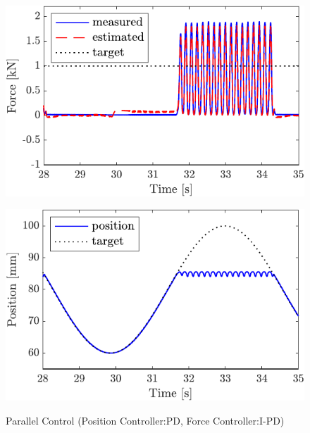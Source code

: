 \begin{figure}[t]
    \begin{minipage}{\minipageratio\hsize}
    \centering
        \includegraphics[keepaspectratio, scale = \minifigscale]{contents/IntegrationControl/figure/SECASQ/crop-FBsw_IPD_force.pdf}
        \label{fig5:crop-FBsw_IPD_force}
    \end{minipage}
    \begin{minipage}{\minipageratio\hsize}
    \centering
        \includegraphics[keepaspectratio, scale = \minifigscale]
        {contents/IntegrationControl/figure/SECASQ/crop-FBsw_IPD_pos.pdf}
        \label{fig5:crop-FBsw_IPD_pos}
    \end{minipage}
    \caption{Parallel Control (Position Controller:PD, Force Controller:I-PD)}
    \label{fig5:crop-FBsw_IPD}
\end{figure}

